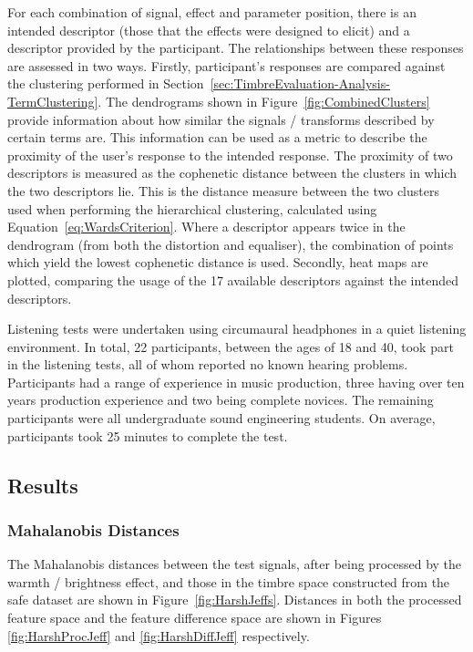 			For each combination of signal, effect and parameter position, there is an intended descriptor
			(those that the effects were designed to elicit) and a descriptor provided by the participant. The
			relationships between these responses are assessed in two ways. Firstly, participant's responses
			are compared against the clustering performed in
			Section~\ref{sec:TimbreEvaluation-Analysis-TermClustering}. The dendrograms shown in
			Figure~\ref{fig:CombinedClusters} provide information about how similar the signals / transforms
			described by certain terms are. This information can be used as a metric to describe the proximity
			of the user's response to the intended response. The proximity of two descriptors is measured as
			the cophenetic distance between the clusters in which the two descriptors lie. This is the distance
			measure between the two clusters used when performing the hierarchical clustering, calculated using
			Equation~\ref{eq:WardsCriterion}. Where a descriptor appears twice in the dendrogram (from both the
			distortion and equaliser), the combination of points which yield the lowest cophenetic distance is
			used. Secondly, heat maps are plotted, comparing the usage of the 17 available descriptors against
			the intended descriptors.

			Listening tests were undertaken using circumaural headphones in a quiet listening environment. In
			total, 22 participants, between the ages of 18 and 40, took part in the listening tests, all of
			whom reported no known hearing problems. Participants had a range of experience in music
			production, three having over ten years production experience and two being complete novices. The
			remaining participants were all undergraduate sound engineering students. On average, participants
			took 25 minutes to complete the test.

	\subsection{Results}
	\label{sec:PerceptualExperiments-SemanticControl-Results}
		\subsubsection{Mahalanobis Distances}
			The Mahalanobis distances between the test signals, after being processed by the warmth /
			brightness effect, and those in the timbre space constructed from the \acrshort{safe} dataset are
			shown in Figure~\ref{fig:HarshJeffs}. Distances in both the processed feature space and the feature
			difference space are shown in Figures \ref{fig:HarshProcJeff} and \ref{fig:HarshDiffJeff}
			respectively.

